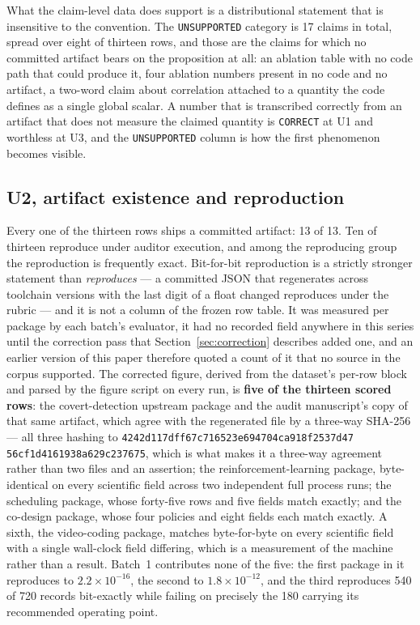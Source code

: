 \documentclass[sigconf,review]{acmart}
\begin{document}
What the claim-level data does support is a distributional statement that is
insensitive to the convention. The \texttt{UNSUPPORTED} category is 17 claims
in total, spread over eight of thirteen rows, and those are the claims for
which no committed artifact bears on the proposition at all: an ablation table
with no code path that could produce it, four ablation numbers present in no
code and no artifact, a two-word claim about correlation attached to a
quantity the code defines as a single global scalar. A number that is
transcribed correctly from an artifact that does not measure the claimed
quantity is \texttt{CORRECT} at U1 and worthless at U3, and the
\texttt{UNSUPPORTED} column is how the first phenomenon becomes visible.

\subsection{U2, artifact existence and reproduction}
\label{sec:res-repro}

Every one of the thirteen rows ships a committed artifact: 13 of 13. Ten of
thirteen reproduce under auditor execution, and among the reproducing group
the reproduction is frequently exact. Bit-for-bit reproduction is a strictly
stronger statement than \emph{reproduces} --- a committed JSON that regenerates
across toolchain versions with the last digit of a float changed reproduces
under the rubric --- and it is not a column of the frozen row table. It was
measured per package by each batch's evaluator, it had no recorded field
anywhere in this series until the correction pass that
Section~\ref{sec:correction} describes added one, and an earlier version of
this paper therefore quoted a count of it that no source in the corpus
supported. The corrected figure, derived from the dataset's per-row block and
parsed by the figure script on every run, is \textbf{five of the thirteen
scored rows}: the covert-detection upstream package and the audit manuscript's
copy of that same artifact, which agree with the regenerated file by a
three-way SHA-256 --- all three hashing to
\texttt{4242d117dff67c716523e694704ca918f2537d47}\allowbreak
\texttt{56cf1d4161938a629c237675}, which is what makes it a three-way
agreement rather than two files and an assertion; the
reinforcement-learning package, byte-identical on every scientific field
across two independent full process runs; the scheduling package, whose
forty-five rows and five fields match exactly; and the co-design package,
whose four policies and eight fields each match exactly. A sixth, the
video-coding package, matches byte-for-byte on every scientific field with a
single wall-clock field differing, which is a measurement of the machine rather
than a result. Batch~1 contributes none of the five: the first package in it
reproduces to $2.2\times10^{-16}$, the second to $1.8\times10^{-12}$, and the
third reproduces 540 of 720 records bit-exactly while failing on precisely the
180 carrying its recommended operating point.
\end{document}
